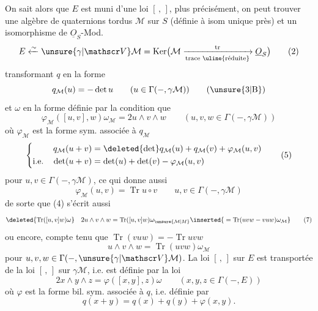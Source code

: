 On sait alors que $E$ est muni d'une loi $[\, ,\, ]$, plus précisément, on peut trouver une algèbre de quaternions tordus $\mathcal M$ sur $S$ (définie à isom unique près) et un isomorphisme de $\underline O_S$-Mod.
\[
E\xleftarrow{\sim}\unsure{\gamma|\mathscr V}\mathcal M=\operatorname{Ker}\bigl(\mathcal M\xrightarrow[\text{trace \uline{réduite}}]{\mathrm{tr}}\underline O_S\bigr)\tag*{(2)}
\]
transformant $q$ en la forme
\[
q_{\mathcal M}(u)=-\det u\qquad(u\in\Gamma(-,\gamma\mathcal M))\tag*{(\unsure{3|B})}
\]
et $\omega$ en la forme  définie par la condition que
\[
\varphi_{\mathcal M}([u,v],w)\omega_{\mathcal M}=2u\wedge v\wedge w\qquad(u,v,w\in\Gamma(-,\gamma\mathcal M))\tag*{(4)}
\]
où $\varphi_{\mathcal M}$ est la forme   sym. associée à $q_{\mathcal M}$
\[
\left\{\begin{aligned}q_{\mathcal M}(u+v)&=\deleted{\det}q_{\mathcal M}(u)+q_{\mathcal M}(v)+\varphi_{\mathcal M}(u,v)\\ \text{i.e.}\quad\det(u+v)&=\det(u)+\det(v)-\varphi_{\mathcal M}(u,v)\end{aligned}\right.\tag*{(5)}
\]
pour $u,v\in\Gamma(-,\gamma\mathcal M)$, ce qui donne aussi
\[
\varphi_{\mathcal M}(u,v)=\operatorname{Tr}u\circ v\qquad u,v\in\Gamma(-,\gamma\mathcal M)\tag*{(6)}
\]
de sorte que (4) s'écrit aussi
\[
\deleted{\operatorname{Tr}([u,v]w)\omega}\quad 2u\wedge v\wedge w=\operatorname{Tr}([u,v]w)\omega_{\unsure{\mathcal M|M}}\inserted{{}=\operatorname{Tr}(uvw-vuw)\omega_{\mathcal M}}\tag*{(7)}
\]
 ou encore, compte tenu que $\operatorname{Tr}(vuw)=-\operatorname{Tr}uvw$
\[
u\wedge v\wedge w=\operatorname{Tr}(uvw)\omega_{\mathcal M}\tag*{(8)}
\]
pour $u,v,w\in\Gamma(-,\unsure{\gamma|\mathscr V}\mathcal M)$. La loi $[\, ,\, ]$ sur $E$ est transportée de la loi $[\, ,\, ]$ sur $\gamma\mathcal M$, i.e. est définie par la loi
\[
2x\wedge y\wedge z=\varphi([x,y],z)\omega\qquad(x,y,z\in\Gamma(-,E))\tag*{(8)}
\]
où $\varphi$ est la forme bil. sym. associée à $q$, i.e. définie par
\[
q(x+y)=q(x)+q(y)+\varphi(x,y).\tag*{(9)}
\]

